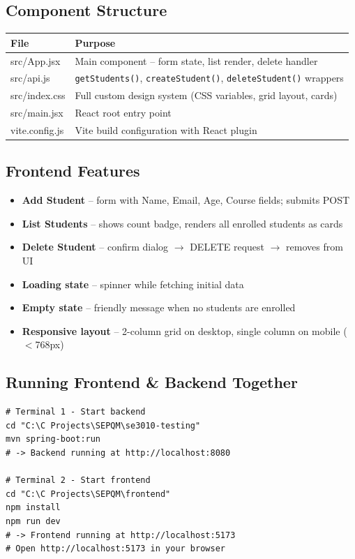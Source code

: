 \documentclass[12pt,a4paper]{article}
\begin{document}
\subsection{Component Structure}

\begin{tabularx}{\textwidth}{>{\ttfamily\small}lX}
\toprule
\textbf{File} & \textbf{Purpose} \\
\midrule
src/App.jsx    & Main component -- form state, list render, delete handler \\
src/api.js     & \texttt{getStudents()}, \texttt{createStudent()}, \texttt{deleteStudent()} wrappers \\
src/index.css  & Full custom design system (CSS variables, grid layout, cards) \\
src/main.jsx   & React root entry point \\
vite.config.js & Vite build configuration with React plugin \\
\bottomrule
\end{tabularx}

\subsection{Frontend Features}

\begin{itemize}[noitemsep]
  \item \textbf{Add Student} -- form with Name, Email, Age, Course fields; submits POST
  \item \textbf{List Students} -- shows count badge, renders all enrolled students as cards
  \item \textbf{Delete Student} -- confirm dialog $\to$ DELETE request $\to$ removes from UI
  \item \textbf{Loading state} -- spinner while fetching initial data
  \item \textbf{Empty state} -- friendly message when no students are enrolled
  \item \textbf{Responsive layout} -- 2-column grid on desktop, single column on mobile ($<$768px)
\end{itemize}

\subsection{Running Frontend \& Backend Together}

\begin{lstlisting}[style=shellStyle, numbers=none, caption={Full stack development setup}]
# Terminal 1 - Start backend
cd "C:\C Projects\SEPQM\se3010-testing"
mvn spring-boot:run
# -> Backend running at http://localhost:8080

# Terminal 2 - Start frontend
cd "C:\C Projects\SEPQM\frontend"
npm install
npm run dev
# -> Frontend running at http://localhost:5173
# Open http://localhost:5173 in your browser
\end{lstlisting}
\end{document}
